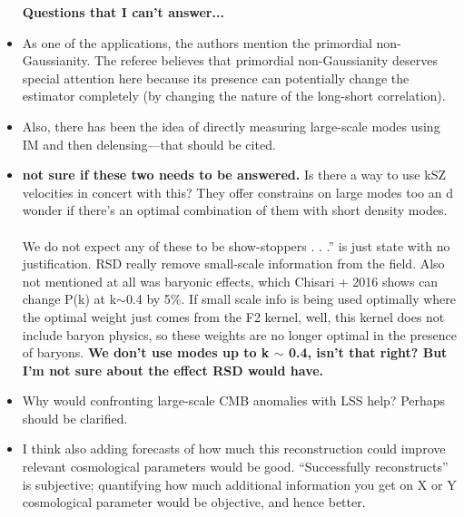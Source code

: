 \documentclass{article}
\begin{document}
\begin{itemize}
\textbf{Questions that I can't answer...}
\item As one of the applications, the authors mention the primordial
non-Gaussianity. The referee believes that primordial non-Gaussianity
deserves special attention here because its presence can potentially
change the estimator completely (by changing the nature of the
long-short correlation).
\item Also, there has been the idea of directly measuring large-scale modes using IM and then delensing—that should be cited.
\item \textbf{not sure if these two needs to be answered.} Is there a way to use kSZ velocities in concert with this? They offer constrains on large modes too an d wonder if there’s an optimal combination of them with short density modes.\\ \\ We do not expect any of these to be show-stoppers . . .” is just state with no justification. RSD really remove small-scale information from the field. Also not mentioned at all was baryonic effects, which Chisari + 2016 shows can change P(k) at k$\sim$0.4 by 5\%. If small scale info is being used optimally where the optimal weight just comes from the F2 kernel, well, this kernel does not include baryon physics, so these weights are no longer optimal in the presence of baryons. \textbf{We don't use modes up to k $\sim$ 0.4, isn't that right? But I'm not sure about the effect RSD would have.}
\item Why would confronting large-scale CMB anomalies with LSS help? Perhaps should be clarified. 
\item I think also adding forecasts of how much this reconstruction could improve relevant cosmological parameters would be good. “Successfully reconstructs” is subjective; quantifying how much additional information you get on X or Y cosmological parameter would be objective, and hence better. 




\end{itemize}
\end{document}
